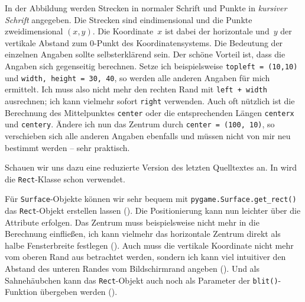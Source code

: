%
%
%
%
%
%
%
%
%
%
%
In der Abbildung werden Strecken in normaler Schrift und Punkte in \textit{kursiver Schrift} angegeben. Die Strecken sind eindimensional und die Punkte zweidimensional $(x,y)$. Die Koordinate~$x$ ist dabei der horizontale und~$y$ der vertikale Abstand zum 0-Punkt des Koordinatensystems. Die Bedeutung der einzelnen Angaben sollte selbsterklärend sein. Der schöne Vorteil ist, dass die Angaben sich gegenseitig berechnen. Setze ich beispielsweise \texttt{topleft = (10,10)} und \texttt{width, height = 30, 40}, so werden alle anderen Angaben für mich ermittelt. Ich muss also nicht mehr den rechten Rand mit \texttt{left + width} ausrechnen; ich kann vielmehr sofort \texttt{right} verwenden. Auch oft nützlich ist die Berechnung des Mittelpunktes \texttt{center} oder die entsprechenden Längen \texttt{centerx} und \texttt{centery}. Ändere ich nun das Zentrum durch \texttt{center = (100, 10)}, so verschieben sich alle anderen Angaben ebenfalls und müssen nicht von mir neu bestimmt werden -- sehr praktisch.

Schauen wir uns dazu eine reduzierte Version des letzten Quelltextes an. In  wird die \texttt{Rect}-Klasse schon verwendet.


Für \texttt{Surface}-Objekte können wir sehr bequem mit \texttt{pygame.Surface.get\_rect()} das \texttt{Rect}-Objekt erstellen lassen (). Die Positionierung kann nun leichter über die Attribute erfolgen. Das Zentrum muss beispielsweise nicht mehr in die Berechnung einfließen, ich kann vielmehr das horizontale Zentrum direkt als halbe Fensterbreite festlegen (). Auch muss die vertikale Koordinate nicht mehr vom oberen Rand aus betrachtet werden, sondern ich kann viel intuitiver den Abstand des unteren Randes vom Bildschirmrand angeben (). Und als Sahnehäubchen kann das \texttt{Rect}-Objekt auch noch als Parameter der \texttt{blit()}-Funktion übergeben werden ().

